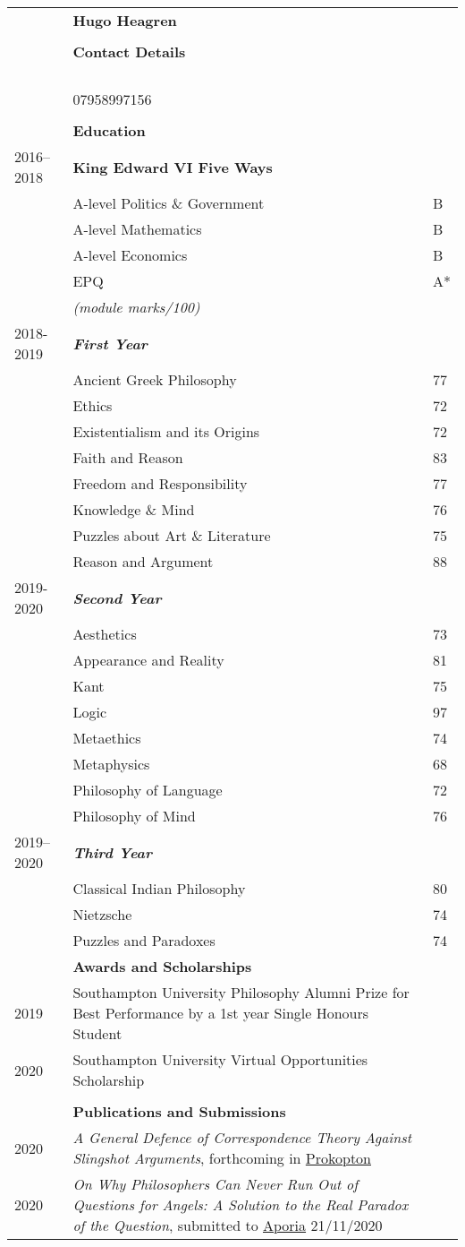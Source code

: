 \documentclass{article}
\makeatletter
\newcommand{\email}[1]{&%
    \IfEqCase{#1}{%
	    {personal}{\href{mailto:\personal}{\personal} \textit{(personal)}\\}
	    {academic}{\href{mailto:\academic}{\academic} \textit{(institution)}\\}
    }[\PackageError{email}{Undefined option to email: #1}{}]%
}
\renewcommand{\section}[1]{\\[-1.0ex]& \multicolumn{2}{l}{\bfseries{\Large{#1}}}\vspace{0.5ex}\\}
\newcommand{\entry}[3]{\scriptsize{\textsc{#1}} & #2 & #3 \\}
\newcommand{\pub}[3]{\entry{#1}{\textit{#2}, #3}{}}
\newcommand{\listentry}[3]{\entry{#1}{\bfseries{#2}}{#3}}
\newcommand{\listsub}[2]{\\ \scriptsize{#1} & \bfseries{\textit{#2}}&}
\newcommand{\etem}[2]{\\ & #1 & #2}
\renewcommand{\title}[1]{&\LARGE{\bfseries{#1}}&\\}
\newcommand{\academic}{hbh1g18@soton.ac.uk}
\newcommand{\personal}{hugo@heagen.com}
\newcommand{\phone}{&07958997156\\}
\makeatother
\begin{document}
\begin{tabularx}{\textwidth}{ p{6em} X p{6em} }
\title{Hugo Heagren}
\section{Contact Details}
\email{academic}
\email{personal}
\phone

\section{Education} 
\listentry{2016--2018}{King Edward VI Five Ways}{
                 \etem{A-level Politics \& Government}{B}
                 \etem{A-level Mathematics}           {B}
                 \etem{A-level Economics}             {B}
                 \etem{EPQ}                           {A*}
}
\listentry{from 2018}{BA Philosophy, University of Southampton}{
\\ & \textit{(module marks/100)}\noindent &
	    \listsub{2018-2019}{First Year}
            \etem{Ancient Greek Philosophy}        {77}
            \etem{Ethics}                          {72}
            \etem{Existentialism and its Origins}  {72}
            \etem{Faith and Reason}                {83}
            \etem{Freedom and Responsibility}      {77}
            \etem{Knowledge \& Mind}               {76}
            \etem{Puzzles about Art \& Literature} {75}
            \etem{Reason and Argument}             {88}
	    \listsub{2019-2020}{Second Year}
            \etem{Aesthetics}                      {73}
            \etem{Appearance and Reality}          {81}
            \etem{Kant}                            {75}
            \etem{Logic}                           {97}
            \etem{Metaethics}                      {74}
            \etem{Metaphysics}                     {68}
            \etem{Philosophy of Language}          {72}
            \etem{Philosophy of Mind}              {76}
	    \listsub{2019--2020}{Third Year}
	    \etem{Classical Indian Philosophy}     {80}
	    \etem{Nietzsche}                       {74}
	    \etem{Puzzles and Paradoxes}           {74}
}
\section{Awards and Scholarships}
\entry{2019}{Southampton University Philosophy Alumni Prize for Best Performance by a 1st year Single Honours Student}{}
\entry{2020}{Southampton University Virtual Opportunities Scholarship}{}

\section{Publications and Submissions}
\pub{2020}{A General Defence of Correspondence Theory Against Slingshot Arguments}{forthcoming in \href{https://prokopton.bilkent.edu.tr/}{Prokopton}}
\pub{2020}{On Why Philosophers Can Never Run Out of Questions for Angels: A Solution to the Real Paradox of the Question}{submitted to \href{https://ojs.st-andrews.ac.uk/index.php/aporia/index}{Aporia} 21/11/2020}


\end{tabularx}
\end{document}
